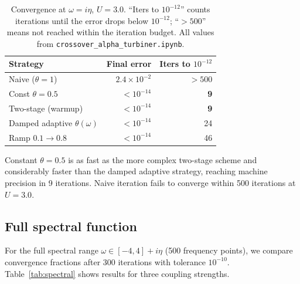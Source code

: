 \documentclass[aps,prb,twocolumn,superscriptaddress,nofootinbib,longbibliography,floatfix]{revtex4-2}
\theoremstyle{plain}
\theoremstyle{remark}
\begin{document}
\begin{table}[tp]
  \centering
  \caption{%
    Convergence at $\omega = i\eta$, $U = 3.0$.
    ``Iters to $10^{-12}$'' counts iterations until the error
    drops below $10^{-12}$; ``$> 500$'' means not reached
    within the iteration budget.
    All values from \texttt{crossover\_alpha\_turbiner.ipynb}.
  }
  \label{tab:convergence}
  \begin{tabular}{@{}l r r@{}}
    \toprule
    Strategy & Final error & Iters to $10^{-12}$ \\
    \midrule
    Naive ($\theta = 1$)       & $2.4 \times 10^{-2}$ & $> 500$ \\
    Const $\theta = 0.5$       & $< 10^{-14}$ & \textbf{9} \\
    Two-stage (warmup)         & $< 10^{-14}$ & \textbf{9} \\
    Damped adaptive $\theta(\omega)$ & $< 10^{-14}$ & 24 \\
    Ramp $0.1 \to 0.8$        & $< 10^{-14}$ & 46 \\
    \bottomrule
  \end{tabular}
\end{table}

Constant $\theta = 0.5$ is as fast as the more complex
two-stage scheme and considerably faster than the damped
adaptive strategy, reaching machine precision in 9 iterations.
Naive iteration fails to converge within 500 iterations at $U = 3.0$.

\subsection{Full spectral function}
\label{ssec:spectral}

For the full spectral range $\omega \in [-4, 4] + i\eta$ (500
frequency points), we compare convergence fractions after 300
iterations with tolerance $10^{-10}$.
Table~\ref{tab:spectral} shows results for three coupling
strengths.
\end{document}

